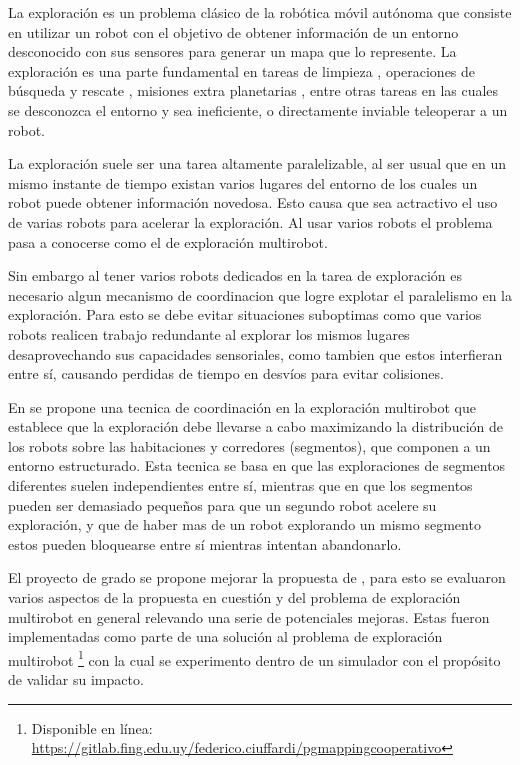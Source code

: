 La exploración es un problema clásico de la robótica móvil autónoma que
consiste en utilizar un robot con el objetivo de obtener información de un
entorno desconocido con sus sensores para generar un mapa que lo represente. La
exploración es una parte fundamental en tareas de limpieza \cite{luo2002real},
operaciones de búsqueda y rescate \cite{Liu2015}, misiones extra planetarias
\cite{schuster2019towards}, entre otras tareas en las cuales se desconozca el
entorno y sea ineficiente, o directamente inviable teleoperar a un robot.

La exploración suele ser una tarea altamente paralelizable, al ser usual que en
un mismo instante de tiempo existan varios lugares del entorno de los cuales un
robot puede obtener información novedosa. Esto causa que sea actractivo el uso
de varias robots para acelerar la exploración. Al usar varios robots el
problema pasa a conocerse como el de exploración multirobot.

Sin embargo al tener varios robots dedicados en la tarea de exploración es
necesario algun mecanismo de coordinacion que logre explotar el paralelismo en
la exploración. Para esto se debe evitar situaciones suboptimas como que varios
robots realicen trabajo redundante al explorar los mismos lugares
desaprovechando sus capacidades sensoriales, como tambien que estos interfieran
entre sí, causando perdidas de tiempo en desvíos para evitar colisiones.

En \cite{wurm2008coordinated} se propone una tecnica de coordinación en la
exploración multirobot que establece que la exploración debe llevarse a cabo
maximizando la distribución de los robots sobre las habitaciones y corredores
(segmentos), que componen a un entorno estructurado. Esta tecnica se basa en
que las exploraciones de segmentos diferentes suelen independientes entre sí,
mientras que en que los segmentos pueden ser demasiado pequeños para que un
segundo robot acelere su exploración, y que de haber mas de un robot explorando
un mismo segmento estos pueden bloquearse entre sí mientras intentan
abandonarlo.

El proyecto de grado se propone mejorar la propuesta de
\cite{wurm2008coordinated}, para esto se evaluaron varios aspectos de la
propuesta en cuestión y del problema de exploración multirobot en general
relevando una serie de potenciales mejoras. Estas fueron implementadas como
parte de una solución al problema de exploración multirobot
\footnote{Disponible en línea:\\
\url{https://gitlab.fing.edu.uy/federico.ciuffardi/pgmappingcooperativo}} con
la cual se experimento dentro de un simulador con el propósito de validar su
impacto.

